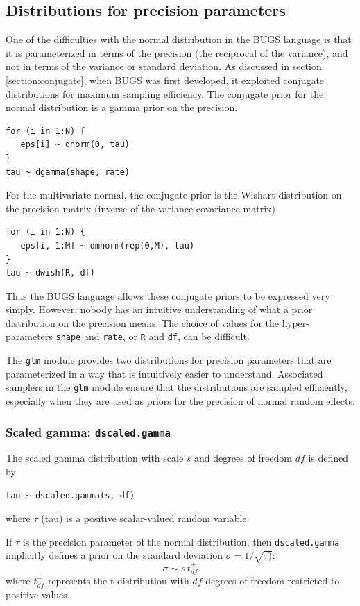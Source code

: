 \documentclass[11pt, a4paper, titlepage]{report}
\begin{document}
{\subsection{Distributions for precision parameters}
\label{section:glm:precision}

One of the difficulties with the normal distribution in the BUGS
language is that it is parameterized in terms of the precision (the
reciprocal of the variance), and not in terms of the variance or
standard deviation. As discussed in section \ref{section:conjugate},
when BUGS was first developed, it exploited conjugate distributions
for maximum sampling efficiency.  The conjugate prior for the normal
distribution is a gamma prior on the precision.
\begin{verbatim}
for (i in 1:N) {
   eps[i] ~ dnorm(0, tau)
}
tau ~ dgamma(shape, rate)
\end{verbatim}
For the multivariate normal, the conjugate prior is the Wishart
distribution on the precision matrix (inverse of the
variance-covariance matrix)
\begin{verbatim}
for (i in 1:N) {
   eps[i, 1:M] ~ dmnorm(rep(0,M), tau)
}
tau ~ dwish(R, df)
\end{verbatim}
Thus the BUGS language allows these conjugate priors to be expressed
very simply. However, nobody has an intuitive understanding of what a
prior distribution on the precision means. The choice of values for
the hyper-parameters \texttt{shape} and \texttt{rate}, or \texttt{R}
and \texttt{df}, can be difficult.

The \texttt{glm} module provides two distributions for precision
parameters that are parameterized in a way that is intuitively easier
to understand. Associated samplers in the \texttt{glm} module ensure
that the distributions are sampled efficiently, especially when they
are used as priors for the precision of normal random effects.

\subsubsection{Scaled gamma: \texttt{dscaled.gamma}}

The scaled gamma distribution with scale $s$ and degrees of freedom $df$
is defined by
\begin{verbatim}
tau ~ dscaled.gamma(s, df)
\end{verbatim}
where $\tau$ (tau) is a positive scalar-valued random variable.

If $\tau$ is the precision parameter of the normal distribution, then
\texttt{dscaled.gamma} implicitly defines a prior on the standard
deviation $\sigma = 1/\sqrt{\tau)}$:
\[
\sigma \sim s \, t_{df}^{+}
\]
where $t_{df}^{+}$ represents the t-distribution with $df$ degrees of
freedom restricted to positive values.

}
\end{document}
